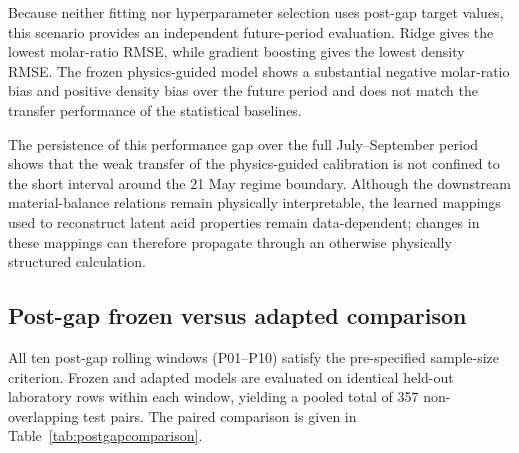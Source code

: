 \documentclass[preprint,12pt,authoryear]{elsarticle}
\begin{document}
\begin{table}[htbp]
\centering
\caption{Strict external post-gap validation (\texttt{external\_transfer\_full}).}
\label{tab:externaltransfer}
\end{table}

Because neither fitting nor hyperparameter selection uses post-gap target values, this scenario provides an independent future-period evaluation. Ridge gives the lowest molar-ratio RMSE, while gradient boosting gives the lowest density RMSE. The frozen physics-guided model shows a substantial negative molar-ratio bias and positive density bias over the future period and does not match the transfer performance of the statistical baselines.

The persistence of this performance gap over the full July--September period shows that the weak transfer of the physics-guided calibration is not confined to the short interval around the 21 May regime boundary. Although the downstream material-balance relations remain physically interpretable, the learned mappings used to reconstruct latent acid properties remain data-dependent; changes in these mappings can therefore propagate through an otherwise physically structured calculation.

\subsection{Post-gap frozen versus adapted comparison}

All ten post-gap rolling windows (P01--P10) satisfy the pre-specified sample-size criterion. Frozen and adapted models are evaluated on identical held-out laboratory rows within each window, yielding a pooled total of 357 non-overlapping test pairs. The paired comparison is given in Table~\ref{tab:postgapcomparison}.
\end{document}
